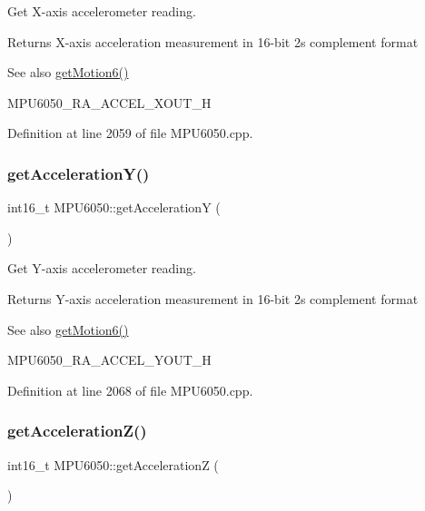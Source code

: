 Get X-\/axis accelerometer reading. 

\begin{DoxyReturn}{Returns}
X-\/axis acceleration measurement in 16-\/bit 2\textquotesingle{}s complement format 
\end{DoxyReturn}
\begin{DoxySeeAlso}{See also}
\mbox{\hyperlink{classMPU6050_a574d3093dc131e4251a9b37adf208ca7}{get\+Motion6()}} 

M\+P\+U6050\+\_\+\+R\+A\+\_\+\+A\+C\+C\+E\+L\+\_\+\+X\+O\+U\+T\+\_\+H 
\end{DoxySeeAlso}


Definition at line 2059 of file M\+P\+U6050.\+cpp.

\mbox{\label{classMPU6050_a27240b90d3e03c85b7a619b794bb1756}} 
\subsubsection{\texorpdfstring{getAccelerationY()}{getAccelerationY()}}
{\footnotesize\ttfamily int16\+\_\+t M\+P\+U6050\+::get\+AccelerationY (\begin{DoxyParamCaption}{ }\end{DoxyParamCaption})}



Get Y-\/axis accelerometer reading. 

\begin{DoxyReturn}{Returns}
Y-\/axis acceleration measurement in 16-\/bit 2\textquotesingle{}s complement format 
\end{DoxyReturn}
\begin{DoxySeeAlso}{See also}
\mbox{\hyperlink{classMPU6050_a574d3093dc131e4251a9b37adf208ca7}{get\+Motion6()}} 

M\+P\+U6050\+\_\+\+R\+A\+\_\+\+A\+C\+C\+E\+L\+\_\+\+Y\+O\+U\+T\+\_\+H 
\end{DoxySeeAlso}


Definition at line 2068 of file M\+P\+U6050.\+cpp.

\mbox{\label{classMPU6050_acf5f5a20c10d99a1bdedf139f897bfdf}} 
\subsubsection{\texorpdfstring{getAccelerationZ()}{getAccelerationZ()}}
{\footnotesize\ttfamily int16\+\_\+t M\+P\+U6050\+::get\+AccelerationZ (\begin{DoxyParamCaption}{ }\end{DoxyParamCaption})}



